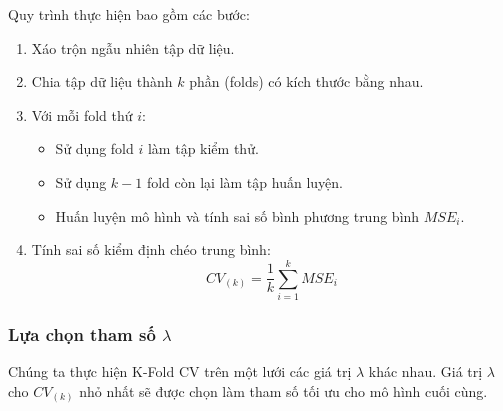 Quy trình thực hiện bao gồm các bước:
\begin{enumerate}
    \item Xáo trộn ngẫu nhiên tập dữ liệu.
    \item Chia tập dữ liệu thành $k$ phần (folds) có kích thước bằng nhau.
    \item Với mỗi fold thứ $i$:
    \begin{itemize}
        \item Sử dụng fold $i$ làm tập kiểm thử.
        \item Sử dụng $k-1$ fold còn lại làm tập huấn luyện.
        \item Huấn luyện mô hình và tính sai số bình phương trung bình $MSE_i$.
    \end{itemize}
    \item Tính sai số kiểm định chéo trung bình:
    \begin{equation}
        CV_{(k)} = \frac{1}{k} \sum_{i=1}^{k} MSE_i
    \end{equation}
\end{enumerate}

\subsubsection{Lựa chọn tham số $\lambda$}
Chúng ta thực hiện K-Fold CV trên một lưới các giá trị $\lambda$ khác nhau. Giá trị $\lambda$ cho $CV_{(k)}$ nhỏ nhất sẽ được chọn làm tham số tối ưu cho mô hình cuối cùng.
